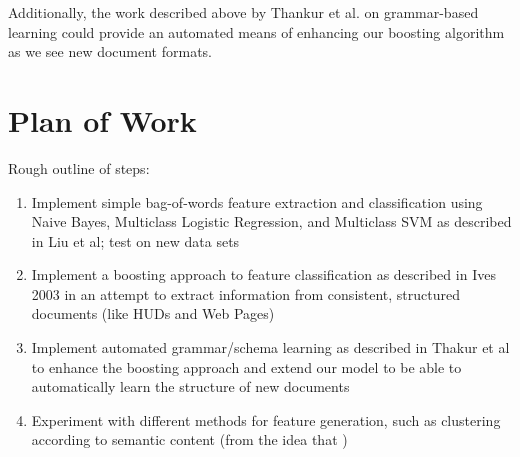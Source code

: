 \documentclass[twoside,10pt]{article}
\theoremstyle{definition}
\theoremstyle{definition}
\theoremstyle{remark}
\renewcommand{\>}{{\rightarrow}}
\newcommand{\1}{{\mathbf 1}}
\newcommand{\0}{{\mathbf 0}}
\begin{document}
Additionally, the work described above by Thankur et al. on grammar-based learning could provide an automated means of enhancing our boosting algorithm as we see new document formats.

\section{Plan of Work}

Rough outline of steps:

\begin{enumerate}
    \item
    Implement simple bag-of-words feature extraction and classification using Naive Bayes, Multiclass Logistic Regression, and Multiclass SVM as described in {Liu et al}; test on new data sets

    \item
    Implement a boosting approach to feature classification as described in {Ives 2003} in an attempt to extract information from consistent, structured documents (like HUDs and Web Pages)

    \item
    Implement automated grammar/schema learning as described in {Thakur et al} to enhance the boosting approach and extend our model to be able to automatically learn the structure of new documents

    \item
    Experiment with different methods for feature generation, such as clustering according to semantic content (from the idea that )
\end{enumerate}
\end{document}
